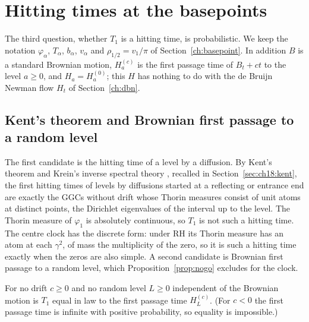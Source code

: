 \section{Hitting times at the basepoints}\label{ch:bphit}

The third question, whether $T_1$ is a hitting time, is probabilistic. We keep the notation $\varphi_\alpha$, $T_\alpha$, $b_\alpha$, $v_\alpha$ and $\rho_{1/2}=v_1/\pi$ of Section~\ref{ch:basepoint}. In addition $B$ is a standard Brownian motion, $H^{(c)}_a$ is the first passage time of $B_t+ct$ to the level $a\ge0$, and $H_a=H^{(0)}_a$; this $H$ has nothing to do with the de Bruijn Newman flow $H_t$ of Section~\ref{ch:dbn}.

\subsection{Kent's theorem and Brownian first passage to a random level}\label{bp:sec:kent}

The first candidate is the hitting time of a level by a diffusion. By Kent's theorem \cite{Kent80} and Krein's inverse spectral theory \cite{DymMcKean76}, recalled in Section~\ref{sec:ch18:kent}, the first hitting times of levels by diffusions started at a reflecting or entrance end are exactly the GGCs without drift whose Thorin measures consist of unit atoms at distinct points, the Dirichlet eigenvalues of the interval up to the level. The Thorin measure of $\varphi_1$ is absolutely continuous, so $T_1$ is not such a hitting time. The centre clock has the discrete form: under RH its Thorin measure has an atom at each $\gamma^2$, of mass the multiplicity of the zero, so it is such a hitting time exactly when the zeros are also simple. A second candidate is Brownian first passage to a random level, which Proposition~\ref{prop:nogo} excludes for the clock.

\begin{proposition}\label{bp:prop:nogo}
For no drift $c\ge0$ and no random level $L\ge0$ independent of the Brownian motion is $T_1$ equal in law to the first passage time $H^{(c)}_L$. (For $c<0$ the first passage time is infinite with positive probability, so equality is impossible.)
\end{proposition}

